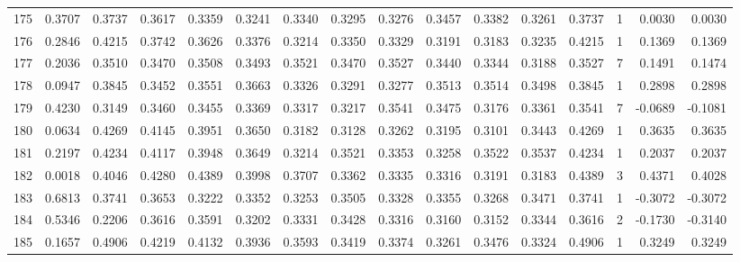 \begin{tabular}{lrrrrrrrrrrrrrrr}
175 &      0.3707 &  0.3737 &  0.3617 &  0.3359 &  0.3241 &  0.3340 &  0.3295 &  0.3276 &  0.3457 &  0.3382 &   0.3261 &     0.3737 &      1 &                    0.0030 &                     0.0030 \\
176 &      0.2846 &  0.4215 &  0.3742 &  0.3626 &  0.3376 &  0.3214 &  0.3350 &  0.3329 &  0.3191 &  0.3183 &   0.3235 &     0.4215 &      1 &                    0.1369 &                     0.1369 \\
177 &      0.2036 &  0.3510 &  0.3470 &  0.3508 &  0.3493 &  0.3521 &  0.3470 &  0.3527 &  0.3440 &  0.3344 &   0.3188 &     0.3527 &      7 &                    0.1491 &                     0.1474 \\
178 &      0.0947 &  0.3845 &  0.3452 &  0.3551 &  0.3663 &  0.3326 &  0.3291 &  0.3277 &  0.3513 &  0.3514 &   0.3498 &     0.3845 &      1 &                    0.2898 &                     0.2898 \\
179 &      0.4230 &  0.3149 &  0.3460 &  0.3455 &  0.3369 &  0.3317 &  0.3217 &  0.3541 &  0.3475 &  0.3176 &   0.3361 &     0.3541 &      7 &                   -0.0689 &                    -0.1081 \\
180 &      0.0634 &  0.4269 &  0.4145 &  0.3951 &  0.3650 &  0.3182 &  0.3128 &  0.3262 &  0.3195 &  0.3101 &   0.3443 &     0.4269 &      1 &                    0.3635 &                     0.3635 \\
181 &      0.2197 &  0.4234 &  0.4117 &  0.3948 &  0.3649 &  0.3214 &  0.3521 &  0.3353 &  0.3258 &  0.3522 &   0.3537 &     0.4234 &      1 &                    0.2037 &                     0.2037 \\
182 &      0.0018 &  0.4046 &  0.4280 &  0.4389 &  0.3998 &  0.3707 &  0.3362 &  0.3335 &  0.3316 &  0.3191 &   0.3183 &     0.4389 &      3 &                    0.4371 &                     0.4028 \\
183 &      0.6813 &  0.3741 &  0.3653 &  0.3222 &  0.3352 &  0.3253 &  0.3505 &  0.3328 &  0.3355 &  0.3268 &   0.3471 &     0.3741 &      1 &                   -0.3072 &                    -0.3072 \\
184 &      0.5346 &  0.2206 &  0.3616 &  0.3591 &  0.3202 &  0.3331 &  0.3428 &  0.3316 &  0.3160 &  0.3152 &   0.3344 &     0.3616 &      2 &                   -0.1730 &                    -0.3140 \\
185 &      0.1657 &  0.4906 &  0.4219 &  0.4132 &  0.3936 &  0.3593 &  0.3419 &  0.3374 &  0.3261 &  0.3476 &   0.3324 &     0.4906 &      1 &                    0.3249 &                     0.3249 \\

\end{tabular}
